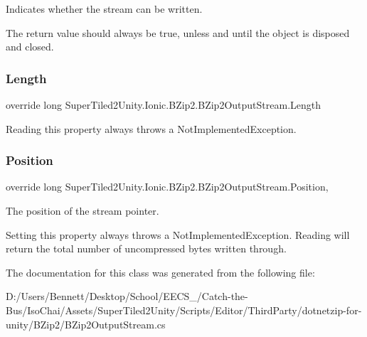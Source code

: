 Indicates whether the stream can be written. 

The return value should always be true, unless and until the object is disposed and closed. \mbox{\label{class_super_tiled2_unity_1_1_ionic_1_1_b_zip2_1_1_b_zip2_output_stream_a0c0afbfd277e00496c360a7b415ceb88}} 
\subsubsection{\texorpdfstring{Length}{Length}}
{\footnotesize\ttfamily override long Super\+Tiled2\+Unity.\+Ionic.\+B\+Zip2.\+B\+Zip2\+Output\+Stream.\+Length\hspace{0.3cm}{\ttfamily [get]}}



Reading this property always throws a Not\+Implemented\+Exception. 

\mbox{\label{class_super_tiled2_unity_1_1_ionic_1_1_b_zip2_1_1_b_zip2_output_stream_ad6f2f4ac9c306cbeecdc5e2178e2a316}} 
\subsubsection{\texorpdfstring{Position}{Position}}
{\footnotesize\ttfamily override long Super\+Tiled2\+Unity.\+Ionic.\+B\+Zip2.\+B\+Zip2\+Output\+Stream.\+Position\hspace{0.3cm}{\ttfamily [get]}, {\ttfamily [set]}}



The position of the stream pointer. 

Setting this property always throws a Not\+Implemented\+Exception. Reading will return the total number of uncompressed bytes written through. 

The documentation for this class was generated from the following file\+:\begin{DoxyCompactItemize}
\item 
D\+:/\+Users/\+Bennett/\+Desktop/\+School/\+E\+E\+C\+S\+\_/\+Catch-\/the-\/\+Bus/\+Iso\+Chai/\+Assets/\+Super\+Tiled2\+Unity/\+Scripts/\+Editor/\+Third\+Party/dotnetzip-\/for-\/unity/\+B\+Zip2/B\+Zip2\+Output\+Stream.\+cs\end{DoxyCompactItemize}
